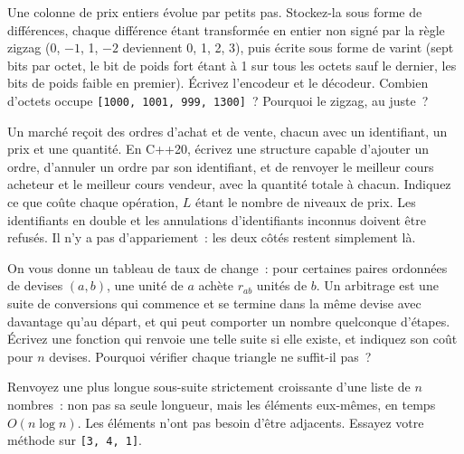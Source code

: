 \begin{question}\label{iq:iv3:algorithms:48}
Une colonne de prix entiers évolue par petits pas. Stockez-la sous forme de différences, chaque différence étant transformée en entier non signé par la règle zigzag (0, $-1$, 1, $-2$ deviennent 0, 1, 2, 3), puis écrite sous forme de varint (sept bits par octet, le bit de poids fort étant à 1 sur tous les octets sauf le dernier, les bits de poids faible en premier). Écrivez l'encodeur et le décodeur. Combien d'octets occupe \texttt{[1000, 1001, 999, 1300]}~? Pourquoi le zigzag, au juste~?
\end{question}

\begin{question}\label{iq:iv3:algorithms:49}
Un marché reçoit des ordres d'achat et de vente, chacun avec un identifiant, un prix et une quantité. En C++20, écrivez une structure capable d'ajouter un ordre, d'annuler un ordre par son identifiant, et de renvoyer le meilleur cours acheteur et le meilleur cours vendeur, avec la quantité totale à chacun. Indiquez ce que coûte chaque opération, $L$ étant le nombre de niveaux de prix. Les identifiants en double et les annulations d'identifiants inconnus doivent être refusés. Il n'y a pas d'appariement~: les deux côtés restent simplement là.
\end{question}

\begin{question}\label{iq:iv3:algorithms:50}
On vous donne un tableau de taux de change~: pour certaines paires ordonnées de devises $(a, b)$, une unité de $a$ achète $r_{ab}$ unités de $b$. Un arbitrage est une suite de conversions qui commence et se termine dans la même devise avec davantage qu'au départ, et qui peut comporter un nombre quelconque d'étapes. Écrivez une fonction qui renvoie une telle suite si elle existe, et indiquez son coût pour $n$ devises. Pourquoi vérifier chaque triangle ne suffit-il pas~?
\end{question}

\begin{question}\label{iq:iv3:algorithms:51}
Renvoyez une plus longue sous-suite strictement croissante d'une liste de $n$ nombres~: non pas sa seule longueur, mais les éléments eux-mêmes, en temps $O(n \log n)$. Les éléments n'ont pas besoin d'être adjacents. Essayez votre méthode sur \texttt{[3, 4, 1]}.
\end{question}

